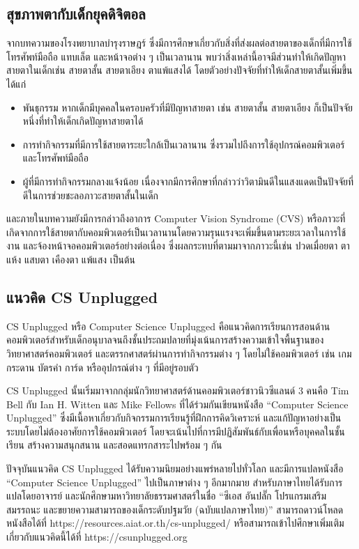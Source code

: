 \subsection{สุขภาพตากับเด็กยุคดิจิตอล}
จากบทความของโรงพยาบาลบํารุงราษฎร์ ซึ่งมีการศึกษาเกี่ยวกับสิ่งที่ส่งผลต่อสายตาของเด็กที่มีการใช้โทรศัพท์มือถือ แทบเล็ต และหน้าจอต่าง ๆ เป็นเวลานาน
พบว่าสิ่งเหล่านี้อาจมีส่วนทำให้เกิดปัญหาสายตาในเด็กเช่น สายตาสั้น สายตาเอียง ตาแพ้แสงได้ โดยตัวอย่างปัจจัยที่ทำให้เด็กสายตาสั้นเพิ่มขึ้น ได้แก่
\begin{itemize}
    \item พันธุกรรม หากเด็กมีบุคคลในครอบครัวที่มีปัญหาสายตา เช่น สายตาสั้น สายตาเอียง ก็เป็นปัจจัยหนึ่งที่ทำให้เด็กเกิดปัญหาสายตาได้
    \item การทำกิจกรรมที่มีการใช้สายตาระยะใกล้เป็นเวลานาน ซึ่งรวมไปถึงการใช้อุปกรณ์คอมพิวเตอร์ และโทรศัพท์มือถือ
    \item ผู้ที่มีการทำกิจกรรมกลางแจ้งน้อย เนื่องจากมีการศึกษาที่กล่าวว่าวิตามินดีในแสงแดดเป็นปัจจัยที่ดีในการช่วยชะลอภาวะสายตาสั้นในเด็ก \cite{ChildrenEyesHealthCare}
\end{itemize}
และภายในบทความยังมีการกล่าวถึงอาการ Computer Vision Syndrome (CVS) หรือภาวะที่เกิดจากการใช้สายตากับคอมพิวเตอร์เป็นเวลานานโดยความรุนแรงจะเพิ่มขึ้นตามระยะเวลาในการใช้งาน
และจ้องหน้าจอคอมพิวเตอร์อย่างต่อเนื่อง ซึ่งผลกระทบที่ตามมาจากภาวะนี้เช่น ปวดเมื่อยตา ตาแห้ง แสบตา เคืองตา แพ้แสง เป็นต้น \cite{ComputerVisionSyndrome}

\subsection{แนวคิด CS Unplugged}
CS Unplugged หรือ Computer Science Unplugged คือแนวคิดการเรียนการสอนด้านคอมพิวเตอร์สำหรับเด็กอนุบาลจนถึงชั้นประถมปลายที่มุ่งเน้นการสร้างความเข้าใจพื้นฐานของวิทยาศาสตร์คอมพิวเตอร์
และตรรกศาสตร์ผ่านการทำกิจกรรมต่าง ๆ โดยไม่ใช้คอมพิวเตอร์ เช่น เกมกระดาน บัตรคำ การ์ด หรืออุปกรณ์ต่าง ๆ ที่มีอยู่รอบตัว \cite{CSUnplugged} \cite{CSUnplugged2}

CS Unplugged นั้นเริ่มมาจากกลุ่มนักวิทยาศาสตร์ด้านคอมพิวเตอร์ชาวนิวซีแลนด์ 3 คนคือ Tim Bell กับ Ian H. Witten และ Mike Fellows ที่ได้ร่วมกันเขียนหนังสือ “Computer Science Unplugged”
ซึ่งมีเนื้อหาเกี่ยวกับกิจกรรมการเรียนรู้ที่ฝึกการคิดวิเคราะห์ และแก้ปัญหาอย่างเป็นระบบโดยไม่ต้องอาศัยการใช้คอมพิวเตอร์ โดยจะเน้นไปที่การมีปฏิสัมพันธ์กับเพื่อนหรือบุคคลในชั้นเรียน สร้างความสนุกสนาน และสอดแทรกสาระไปพร้อม ๆ กัน

ปัจจุบันแนวคิด CS Unplugged ได้รับความนิยมอย่างแพร่หลายไปทั่วโลก และมีการแปลหนังสือ “Computer Science Unplugged” ไปเป็นภาษาต่าง ๆ อีกมากมาย สำหรับภาษาไทยได้รับการแปลโดยอาจารย์
และนักศึกษามหาวิทยาลัยธรรมศาสตร์ในชื่อ “ซีเอส อันปลั๊ก โปรแกรมเสริมสมรรถนะ และขยายความสามารถของเด็กระดับปฐมวัย (ฉบับแปลภาษาไทย)” สามารถดาวน์โหลดหนังสือได้ที่
https://resources.aiat.or.th/cs-unplugged/ หรือสามารถเข้าไปศึกษาเพิ่มเติมเกี่ยวกับแนวคิดนี้ได้ที่ https://csunplugged.org

